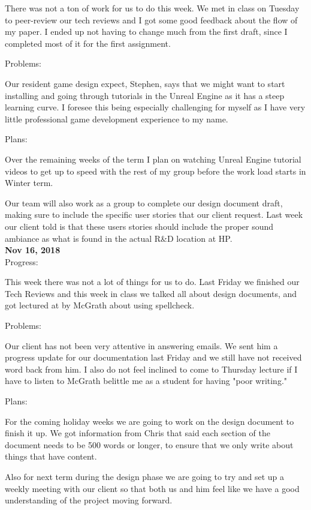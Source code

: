 There was not a ton of work for us to do this week. We met in class on Tuesday to peer-review our tech reviews and I got some good feedback about the flow of my paper. I ended up not having to change much from the first draft, since I completed most of it for the first assignment.

Problems:

Our resident game design expect, Stephen, says that we might want to start installing and going through tutorials in the Unreal Engine as it has a steep learning curve. I foresee this being especially challenging for myself as I have very little professional game development experience to my name.

Plans:

Over the remaining weeks of the term I plan on watching Unreal Engine tutorial videos to get up to speed with the rest of my group before the work load starts in Winter term. 

Our team will also work as a group to complete our design document draft, making sure to include the specific user stories that our client request. Last week our client told is that these users stories should include the proper sound ambiance as what is found in the actual R\&D location at HP.\\

\textbf{Nov 16, 2018}\\
Progress:

This week there was not a lot of things for us to do. Last Friday we finished our Tech Reviews and this week in class we talked all about design documents, and got lectured at by McGrath about using spellcheck.

Problems:

Our client has not been very attentive in answering emails. We sent him a progress update for our documentation last Friday and we still have not received word back from him. I also do not feel inclined to come to Thursday lecture if I have to listen to McGrath belittle me as a student for having "poor writing."

Plans:

For the coming holiday weeks we are going to work on the design document to finish it up. We got information from Chris that said each section of the document needs to be 500 words or longer, to ensure that we only write about things that have content.

Also for next term during the design phase we are going to try and set up a weekly meeting with our client so that both us and him feel like we have a good understanding of the project moving forward.\\

